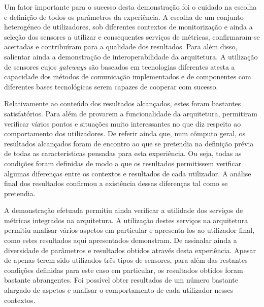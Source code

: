 Um fator importante para o sucesso desta demonstração foi o cuidado na escolha e definição de todos os parâmetros da experiência. A escolha de um conjunto heterogéneo de utilizadores, sob diferentes contextos de monitorização e ainda a seleção dos sensores a utilizar e consequentes serviços de métricas, confirmaram-se acertadas e contribuíram para a qualidade dos resultados. Para além disso, salientar ainda a demonstração de interoperabilidade da arquitetura. A utilização de sensores cujos \textit{gateways} são baseados em tecnologias diferentes atesta a capacidade dos métodos de comunicação implementados e de componentes com diferentes bases tecnológicas serem capazes de cooperar com sucesso.

Relativamente ao conteúdo dos resultados alcançados, estes foram bastantes satisfatórios. Para além de provarem a funcionalidade da arquitetura, permitiram verificar vários pontos e situações muito interessantes no que diz respeito ao comportamento dos utilizadores. De referir ainda que, num cômputo geral, os resultados alcançados foram de encontro ao que se pretendia na definição prévia de todas as características pensadas para esta experiência. Ou seja, todas as condições foram definidas de modo a que os resultados permitissem verificar algumas diferenças entre os contextos e resultados de cada utilizador. A análise final dos resultados confirmou a existência dessas diferenças tal como se pretendia.

A demonstração efetuada permitiu ainda verificar a utilidade dos serviços de métricas integrados na arquitetura. A utilização destes serviços na arquitetura permitiu analisar vários aspetos em particular e apresenta-los ao utilizador final, como estes resultados aqui apresentados demonstram. De assinalar ainda a diversidade de parâmetros e resultados obtidos através desta experiência. Apesar de apenas terem sido utilizados três tipos de sensores, para além das restantes condições definidas para este caso em particular, os resultados obtidos foram bastante abrangentes. Foi possível obter resultados de um número bastante alargado de aspetos e analisar o comportamento de cada utilizador nesses contextos.